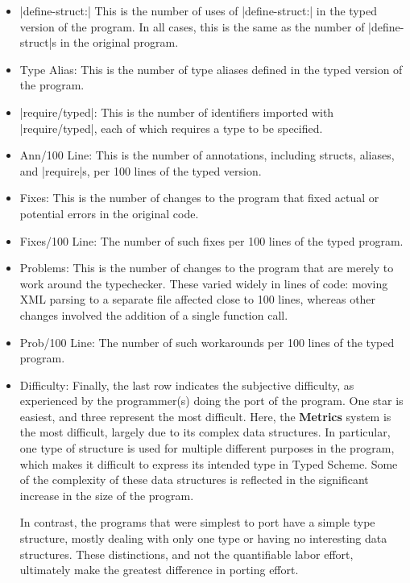\begin{schemeregion}
\begin{itemize}
\item \scheme|define-struct:|  This is the number of uses of
  \scheme|define-struct:| in the typed version of the program.  In all
  cases, this is the same as the number of \scheme|define-struct|s in
  the original program.

\item {\sc Type Alias:}  This is the number of type aliases defined in
  the typed version of the program.  

\item \scheme|require/typed|:  This is the number of identifiers
  imported with \scheme|require/typed|, each of which requires a type
  to be specified.

\item {\sc Ann/100 Line:}  This is the number of annotations, including
  structs, aliases, and \scheme|require|s, per 100 lines of the typed
  version. 

\item {\sc Fixes:} This is the number of changes to the program that
  fixed actual or potential errors in the original code.

\item {\sc Fixes/100 Line:} The number of such fixes per 100 lines of
  the typed program.

\item {\sc Problems:} This is the number of changes to the program that
  are merely to work around the typechecker.  These varied widely in
  lines of code: moving XML parsing to a separate file affected close
  to 100 lines, whereas other changes involved the addition of a
  single function call.

\item {\sc Prob/100 Line:} The number of such workarounds per 100 lines of
  the typed program.

\item {\sc Difficulty:} Finally, the last row indicates the subjective
  difficulty, as experienced by the programmer(s) doing the port of the
  program. One star is easiest, and three represent the most
  difficult.  Here, the {\bf Metrics} system is the most
  difficult, largely due to its complex data structures.  In
  particular, one type of structure is used for multiple different
  purposes in the program, which makes it difficult to express its
  intended type in Typed Scheme.  Some of the complexity of these data
  structures is reflected in the significant increase in the size of
  the program.

In contrast, the programs that were simplest to port have a simple
type structure, mostly dealing with only one type or having no interesting data
structures.  These distinctions, and not the 
quantifiable labor effort, ultimately make the greatest difference in porting
effort.


\end{itemize}
\end{schemeregion}
